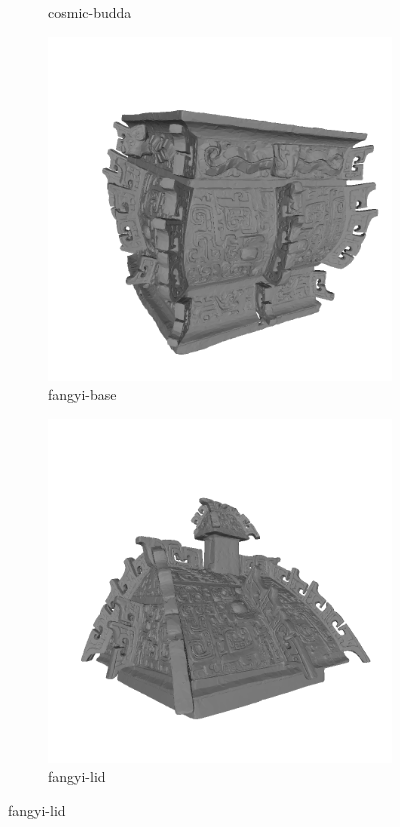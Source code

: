 \begin{figure}
\begin{subfigure}[b]{0.23\linewidth}
		\caption{cosmic-budda}
	\end{subfigure}
	\begin{subfigure}[b]{0.23\linewidth}
		\includegraphics[width=\linewidth]{./Figures/train-dataset/46.fangyi-base.png}
		\caption{fangyi-base}
	\end{subfigure}
	\begin{subfigure}[b]{0.23\linewidth}
		\includegraphics[width=\linewidth]{./Figures/train-dataset/47.fangyi-lid.png}
		\caption{fangyi-lid}
	\end{subfigure}


\end{figure}
